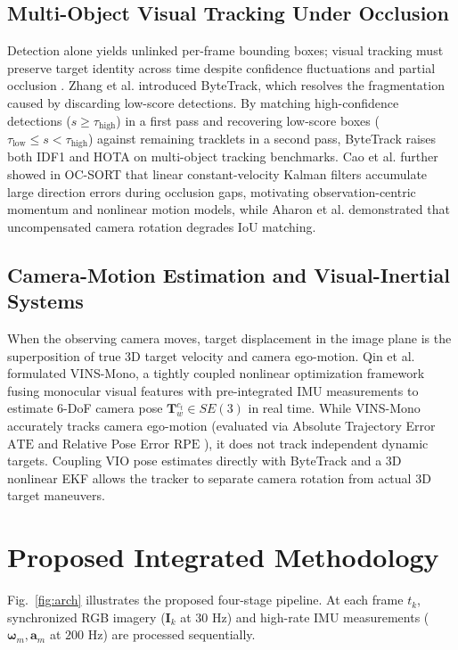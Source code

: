 \documentclass[conference]{IEEEtran}
\begin{document}
\subsection{Multi-Object Visual Tracking Under Occlusion}
Detection alone yields unlinked per-frame bounding boxes; visual tracking must preserve target identity across time despite confidence fluctuations and partial occlusion \cite{ref9, ref10}. Zhang et al. \cite{ref9} introduced ByteTrack, which resolves the fragmentation caused by discarding low-score detections. By matching high-confidence detections ($s \ge \tau_{\text{high}}$) in a first pass and recovering low-score boxes ($\tau_{\text{low}} \le s < \tau_{\text{high}}$) against remaining tracklets in a second pass, ByteTrack raises both IDF1 \cite{ref17} and HOTA \cite{ref16} on multi-object tracking benchmarks. Cao et al. \cite{ref10} further showed in OC-SORT that linear constant-velocity Kalman filters accumulate large direction errors during occlusion gaps, motivating observation-centric momentum and nonlinear motion models, while Aharon et al. \cite{ref11} demonstrated that uncompensated camera rotation degrades IoU matching.

\subsection{Camera-Motion Estimation and Visual-Inertial Systems}
When the observing camera moves, target displacement in the image plane is the superposition of true 3D target velocity and camera ego-motion. Qin et al. \cite{ref12} formulated VINS-Mono, a tightly coupled nonlinear optimization framework fusing monocular visual features with pre-integrated IMU measurements to estimate 6-DoF camera pose $\mathbf{T}_{w}^{c_t} \in SE(3)$ in real time. While VINS-Mono accurately tracks camera ego-motion (evaluated via Absolute Trajectory Error $\text{ATE}$ and Relative Pose Error $\text{RPE}$ \cite{ref18}), it does not track independent dynamic targets. Coupling VIO pose estimates directly with ByteTrack and a 3D nonlinear EKF \cite{ref13, ref14} allows the tracker to separate camera rotation from actual 3D target maneuvers.

\section{Proposed Integrated Methodology}
Fig.~\ref{fig:arch} illustrates the proposed four-stage pipeline. At each frame $t_k$, synchronized RGB imagery ($\mathbf{I}_k$ at $30\text{ Hz}$) and high-rate IMU measurements ($\boldsymbol{\omega}_m, \mathbf{a}_m$ at $200\text{ Hz}$) are processed sequentially.
\end{document}
